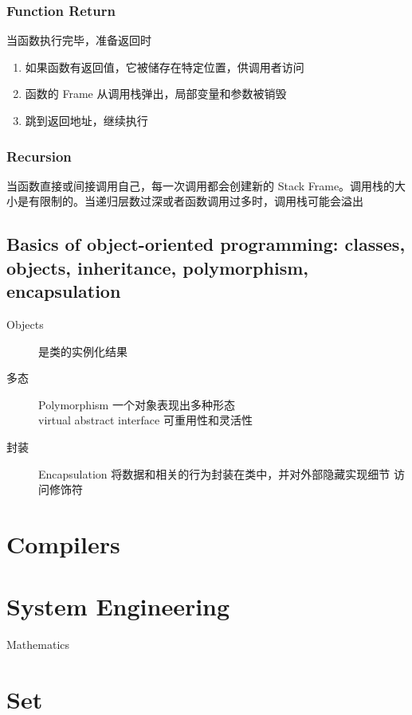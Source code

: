 \documentclass[11pt,journal,compsoc]{IEEEtran}
\begin{document}
\subsubsection{Function Return}

当函数执行完毕，准备返回时

\begin{enumerate}
    \item 如果函数有返回值，它被储存在特定位置，供调用者访问
    \item 函数的 Frame 从调用栈弹出，局部变量和参数被销毁
    \item 跳到返回地址，继续执行
\end{enumerate}


\subsubsection{Recursion}

当函数直接或间接调用自己，每一次调用都会创建新的 Stack Frame。调用栈的大小是有限制的。当递归层数过深或者函数调用过多时，调用栈可能会溢出


\subsection{Basics of object-oriented programming: classes, objects, inheritance, polymorphism, encapsulation}

\begin{description}
    \item[Objects] 是类的实例化结果

    \item[多态] Polymorphism 一个对象表现出多种形态 \\ virtual abstract interface 可重用性和灵活性

    \item[封装] Encapsulation 将数据和相关的行为封装在类中，并对外部隐藏实现细节 访问修饰符
\end{description}


\section{Compilers}


\section{System Engineering}


Mathematics


\section{Set}
\end{document}
